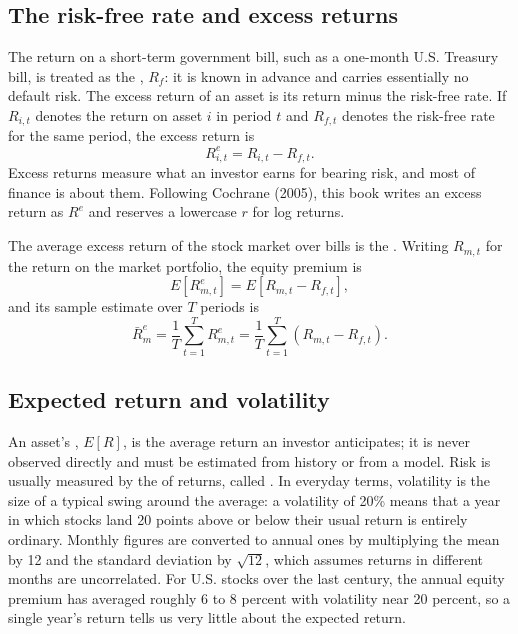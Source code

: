 \subsection{The risk-free rate and excess returns}
\label{sec:01-rf}

The return on a short-term government bill, such as a one-month U.S. Treasury bill, is treated as the , $R_f$: it is known in advance and carries essentially no default risk. 
The excess return of an asset is its return minus the risk-free rate. If $R_{i,t}$ denotes the return on asset $i$ in period $t$ and $R_{f,t}$ denotes the risk-free rate for the same period, the excess return is
\begin{equation}
R^{e}_{i,t} = R_{i,t} - R_{f,t}.
\label{eq:excess-return}
\end{equation}
Excess returns measure what an investor earns for bearing risk, and most of finance is about them. Following Cochrane (2005), this book writes an excess return as $R^{e}$ and reserves a lowercase $r$ for log returns.

The average excess return of the stock market over bills is the . Writing $R_{m,t}$ for the return on the market portfolio, the equity premium is
\begin{equation}
E\left[R^{e}_{m,t}\right] = E\left[R_{m,t} - R_{f,t}\right],
\label{eq:equity-premium}
\end{equation}
and its sample estimate over $T$ periods is
\begin{equation}
\bar{R}^{e}_{m} = \frac{1}{T}\sum_{t=1}^{T} R^{e}_{m,t} = \frac{1}{T}\sum_{t=1}^{T}\left(R_{m,t} - R_{f,t}\right).
\label{eq:equity-premium-sample}
\end{equation}


\subsection{Expected return and volatility}
\label{sec:01-expret}

An asset's , $E[R]$, is the average return an investor anticipates; it is never observed directly and must be estimated from history or from a model. Risk is usually measured by the  of returns, called . In everyday terms, volatility is the size of a typical swing around the average: a volatility of 20\% means that a year in which stocks land 20 points above or below their usual return is entirely ordinary. Monthly figures are converted to annual ones by multiplying the mean by 12 and the standard deviation by $\sqrt{12}$, which assumes returns in different months are uncorrelated. For U.S. stocks over the last century, the annual equity premium has averaged roughly 6 to 8 percent with volatility near 20 percent, so a single year's return tells us very little about the expected return.

